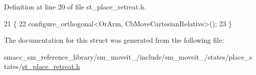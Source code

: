 Definition at line 20 of file st\+\_\+place\+\_\+retreat.\+h.


\begin{DoxyCode}
21             \{
22                 configure\_orthogonal<OrArm, CbMoveCartesianRelative>();
23             \}
\end{DoxyCode}


The documentation for this struct was generated from the following file\+:\begin{DoxyCompactItemize}
\item 
smacc\+\_\+sm\+\_\+reference\+\_\+library/sm\+\_\+moveit\+\_/include/sm\+\_\+moveit\+\_/states/place\+\_\+states/\hyperlink{4_2include_2sm__moveit__4_2states_2place__states_2st__place__retreat_8h}{st\+\_\+place\+\_\+retreat.\+h}\end{DoxyCompactItemize}
